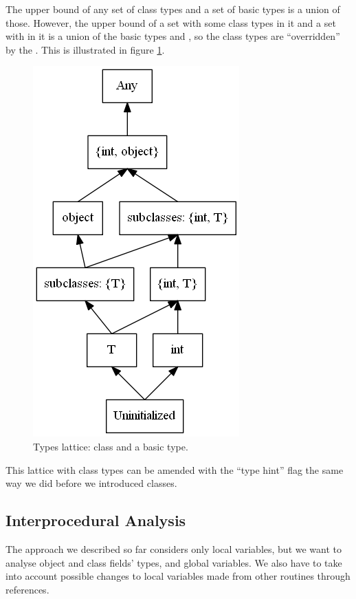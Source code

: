        The upper bound of any set of class types and a set of 
        basic types is a union of those. However, the upper 
        bound of a set with some class types in it and a set with 
         in it is a union of the basic types and 
        , so the class types are ``overridden'' by 
        the . This is illustrated in figure \ref{objectsandbasics}.
        
        \begin{figure}[h]  
          \centering        
          \includegraphics[scale=0.5]{graphs/objects-prim.png}
          \caption{Types lattice: class and a basic type.\label{objectsandbasics}}    
        \end{figure}
        
        This lattice with class types can be amended with the ``type hint'' 
        flag the same way we did before we introduced classes.
        
        \subsection{Interprocedural Analysis}
        
        The approach we described so far considers only local variables, 
        but we want to analyse object and class fields' types, and global 
        variables. We also have to take into account possible changes to 
        local variables made from other routines through references.
        
